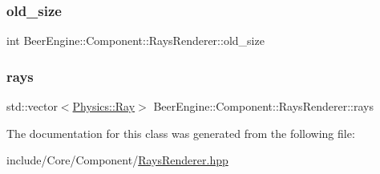 \subsubsection{\texorpdfstring{old\+\_\+size}{old\_size}}
{\footnotesize\ttfamily int Beer\+Engine\+::\+Component\+::\+Rays\+Renderer\+::old\+\_\+size}

\mbox{\label{class_beer_engine_1_1_component_1_1_rays_renderer_a3f80ea11d34b53d1ddddeb0a91f96e30}} 
\subsubsection{\texorpdfstring{rays}{rays}}
{\footnotesize\ttfamily std\+::vector$<$\mbox{\hyperlink{struct_beer_engine_1_1_physics_1_1_ray}{Physics\+::\+Ray}}$>$ Beer\+Engine\+::\+Component\+::\+Rays\+Renderer\+::rays}



The documentation for this class was generated from the following file\+:\begin{DoxyCompactItemize}
\item 
include/\+Core/\+Component/\mbox{\hyperlink{_rays_renderer_8hpp}{Rays\+Renderer.\+hpp}}\end{DoxyCompactItemize}
